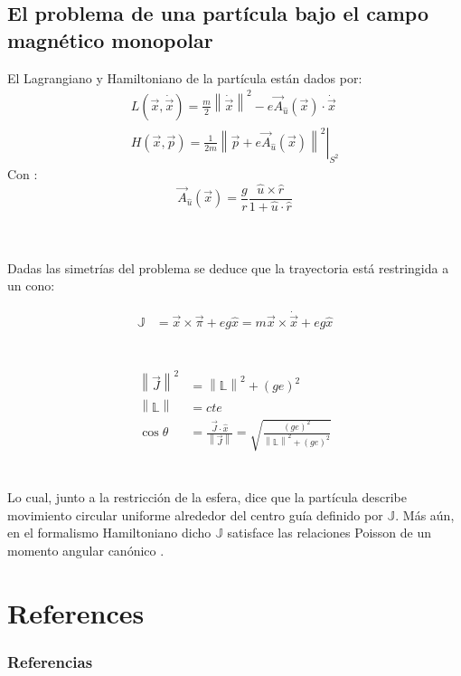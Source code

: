 \documentclass[xcolor=dvipsnames]{beamer}
\newcommand{\norm}[1]{\left\lVert #1 \right\rVert}
\newcommand{\roundP}[1]{\left( #1 \right)}
\begin{document}
\subsection{El problema de una partícula bajo el campo magnético monopolar}
\begin{frame}
El Lagrangiano y Hamiltoniano de la partícula están dados por:
\begin{align*}
L\roundP{\vec{x},\dot{\vec{x}}} = \frac{m}{2}\norm{\dot{\vec{x}}}^2 - e\vec{A}_{\hat{u}}(\vec{x})\cdot\dot{\vec{x}}\\
H\roundP{\vec{x},\vec{p}} = \left.\frac{1}{2m}\norm{\vec{p}+e\vec{A}_{\hat{u}}(\vec{x})}^2\right|_{S^2}
\end{align*}
Con \cite{vectorPotentials}:
\begin{equation*}
\vec{A}_{\hat{u}}(\vec{x}) = \frac{g}{r}\frac{\hat{u}\times\hat{r}}{1+\hat{u}\cdot\hat{r}}
\end{equation*}
\\~\\
\end{frame}
\begin{frame}
Dadas las simetrías del problema se deduce que la trayectoria está restringida a un cono:

\begin{align*}
\mathbb{J} &= \vec{x}\times\vec{\pi}+{eg}\hat{x} = m{\vec{x}}\times\dot{\vec{x}} + eg\hat{x}
\end{align*}
\\~\\
\begin{equation}
\begin{aligned}
\norm{\vec{J}}^2 &= \norm{\mathbb{L}}^2 +\roundP{ge}^2\\
\norm{\mathbb{L}} &= cte\\
\cos{\theta} &= \frac{\vec{J}\cdot\hat{x}}{\norm{\vec{J}}} = \sqrt{\frac{\roundP{ge}^2}{\norm{\mathbb{L}}^2 +\roundP{ge}^2}}
\end{aligned}
\label{eq:poincarecone}
\end{equation}
\\~\\
Lo cual, junto a la restricción de la esfera, dice que la partícula describe movimiento circular uniforme alrededor del centro guía definido por $\mathbb{J}$. Más aún, en el formalismo Hamiltoniano dicho $\mathbb{J}$ satisface las relaciones Poisson de un momento angular canónico \cite{haldane}.\\
\end{frame}

\section{References}
\begin{frame}[t, allowframebreaks]
\frametitle{Referencias}
\tiny


\end{frame}
\end{document}

